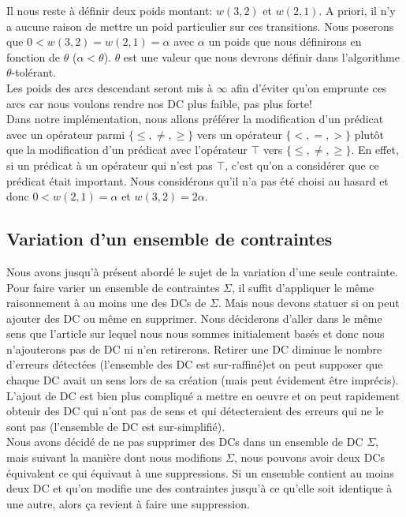 \documentclass[letterpaper, 12pt]{report}
\theoremstyle{definition}
\begin{document}
Il nous reste à définir deux poids montant: $w(3,2)$ et $w(2,1)$. A priori, il n'y a aucune raison de mettre un poid particulier sur ces transitions. Nous poserons que $0 < w(3,2)  = w(2,1) = \alpha$ avec $\alpha$ un poids que nous définirons en fonction de $\theta$ ($\alpha < \theta$). $\theta$ est une valeur que nous devrons définir dans l'algorithme $\theta$-tolérant.\\

Les poids des arcs descendant seront mis à $\infty$ afin d'éviter qu'on emprunte ces arcs car nous voulons rendre nos DC plus faible, pas plus forte!\\

 Dans notre implémentation, nous allons préférer la modification d'un prédicat avec un opérateur parmi $\{ \leq, \neq, \geq \}$ vers un opérateur $\{ <,=,> \}$ plutôt que la modification d'un prédicat avec l'opérateur $\top$ vers $\{ \leq, \neq, \geq \}$. En effet, si un prédicat à un opérateur qui n'est pas $\top$, c'est qu'on a considérer que ce prédicat était important. Nous considérons qu'il n'a pas été choisi au hasard et donc $0 < w(2,1)  = \alpha$ et $w(3,2) = 2\alpha$.

\subsection{Variation d'un ensemble de contraintes}

Nous avons jusqu'à présent abordé le sujet de la variation d'une seule contrainte. Pour faire varier un ensemble de contraintes $\Sigma$, il suffit d'appliquer le même raisonnement à au moins une des DCs de $\Sigma$. Mais nous devons statuer si on peut ajouter des DC ou même en supprimer. Nous déciderons d'aller dans le même sens que l'article sur lequel nous nous sommes initialement basés \cite{bcss} et donc nous n'ajouterons pas de DC ni n'en retirerons. Retirer une DC diminue le nombre d'erreurs détectées (l'ensemble des DC est sur-raffiné)et on peut supposer que chaque DC avait un sens lors de sa création (mais peut évidement être imprécis). L'ajout de DC est bien plus compliqué a mettre en oeuvre et on peut rapidement obtenir des DC qui n'ont pas de sens et qui détecteraient des erreurs qui ne le sont pas (l'ensemble de DC est sur-simplifié).\\

Nous avons décidé de ne pas supprimer des DCs dans un ensemble de DC $\Sigma$, mais suivant la manière dont nous modifions $\Sigma$, nous pouvons avoir deux DCs équivalent ce qui équivaut à une suppressions. Si un ensemble contient au moins deux DC et qu'on modifie une des contraintes jusqu'à ce qu'elle soit identique à une autre, alors ça revient à faire une suppression.
\end{document}

